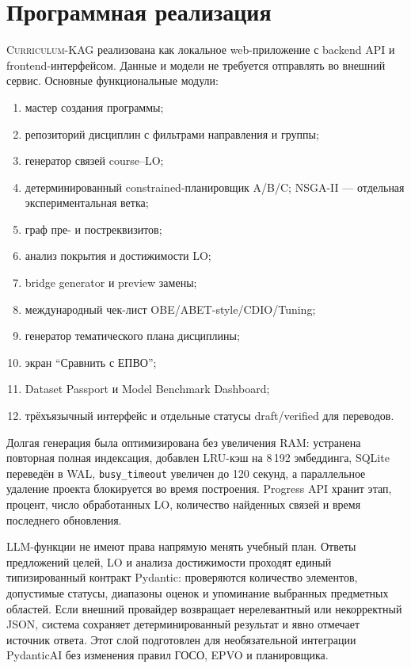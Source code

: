 \documentclass[twoside,11pt]{article}
\newcommand{\systemname}{\textsc{Curriculum-KAG}}
\begin{document}
\section{Программная реализация}

\systemname{} реализована как локальное web-приложение с backend API и frontend-интерфейсом. Данные и модели не требуется отправлять во внешний сервис. Основные функциональные модули:
\begin{enumerate}
  \item мастер создания программы;
  \item репозиторий дисциплин с фильтрами направления и группы;
  \item генератор связей course--LO;
  \item детерминированный constrained-планировщик A/B/C; NSGA-II — отдельная экспериментальная ветка;
  \item граф пре- и постреквизитов;
  \item анализ покрытия и достижимости LO;
  \item bridge generator и preview замены;
  \item международный чек-лист OBE/ABET-style/CDIO/Tuning;
  \item генератор тематического плана дисциплины;
  \item экран ``Сравнить с ЕПВО'';
  \item Dataset Passport и Model Benchmark Dashboard;
  \item трёхъязычный интерфейс и отдельные статусы draft/verified для переводов.
\end{enumerate}

Долгая генерация была оптимизирована без увеличения RAM: устранена повторная полная индексация, добавлен LRU-кэш на 8\,192 эмбеддинга, SQLite переведён в WAL, \texttt{busy\_timeout} увеличен до 120 секунд, а параллельное удаление проекта блокируется во время построения. Progress API хранит этап, процент, число обработанных LO, количество найденных связей и время последнего обновления.

LLM-функции не имеют права напрямую менять учебный план. Ответы предложений целей, LO и анализа достижимости проходят единый типизированный контракт Pydantic: проверяются количество элементов, допустимые статусы, диапазоны оценок и упоминание выбранных предметных областей. Если внешний провайдер возвращает нерелевантный или некорректный JSON, система сохраняет детерминированный результат и явно отмечает источник ответа. Этот слой подготовлен для необязательной интеграции PydanticAI без изменения правил ГОСО, EPVO и планировщика.
\end{document}
